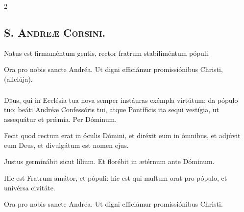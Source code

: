 \documentclass[9pt,twoside]{extarticle}
\begin{document}
\begin{multicols}{2}
\subsection*{\center \textsc{S. Andreæ Corsini.}}

\begin{tightlist}{}
\item {}
\end{tightlist}

\begin{tightlist}{}
\item {} Natus est firmaméntum gentis, rector fratrum stabiliméntum pópuli.
\item {} Ora pro nobis sancte Andréa.  Ut digni efficiámur promissiónibus Christi, (allelúja).
\end{tightlist}
\subsubsection*{\center {}}
\lettrine{D}eus, qui in Ecclésia tua nova semper instáuras exémpla virtútum: da pópulo tuo; beáti Andréæ Confessóris tui, atque Pontíficis ita sequi vestígia, ut assequátur et prǽmia. Per Dóminum.

\begin{tightlist}{}
\item {} Fecit quod rectum erat in óculis Dómini, et diréxit eum in ómnibus, et adjúvit eum Deus, et divulgátum est nomen ejus.
\item {} Justus germinábit sicut lílium.  Et florébit in ætérnum ante Dóminum.
\item {} Hic est Fratrum amátor, et pópuli: hic est qui multum orat pro pópulo, et univérsa civitáte.
\item {} Ora pro nobis sancte Andréa.  Ut digni efficiámur promissiónibus Christi.
\end{tightlist}


\end{multicols}
\end{document}
